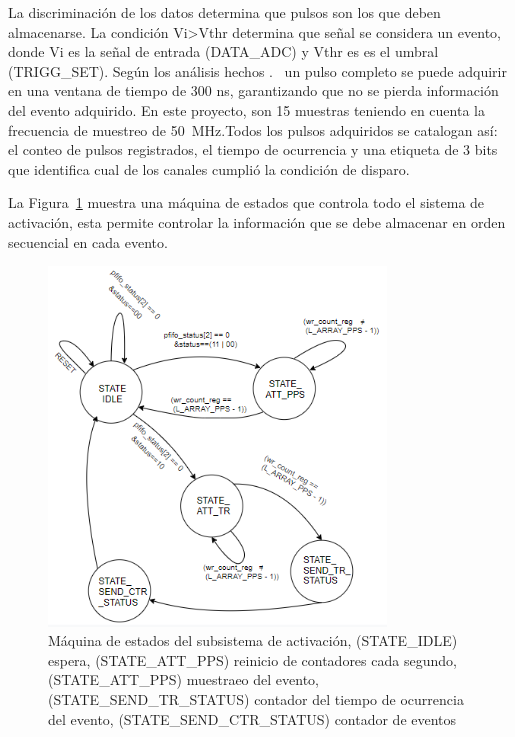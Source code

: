 La discriminación de los datos determina que pulsos son los que deben almacenarse. La condición Vi\textgreater Vthr determina que señal se considera un evento, donde Vi es la señal de entrada (DATA\_ADC) y Vthr es es el umbral (TRIGG\_SET). Según los análisis hechos .~\citep{haro2016data} un pulso completo se puede adquirir en una ventana de tiempo de 300 ns, garantizando que no se pierda información del evento adquirido. En este proyecto, son 15 muestras teniendo en cuenta la frecuencia de muestreo de 50~MHz.Todos los pulsos adquiridos se catalogan así: el conteo de pulsos registrados, el tiempo de ocurrencia y una etiqueta de 3 bits que identifica cual de los canales cumplió la condición de disparo.

La Figura~\ref{maquina} muestra una máquina de estados que controla todo el sistema de activación, esta permite controlar la información que se debe almacenar en orden secuencial en cada evento.

\begin{figure}[h!]
\includegraphics[width=0.8\textwidth]{Figs/fsms.PNG} 
\centering
\caption[Máquina de estados del subsistema de activación]{Máquina de estados del subsistema de activación, (STATE\_IDLE) espera, (STATE\_ATT\_PPS) reinicio de contadores cada segundo, (STATE\_ATT\_PPS) muestraeo del evento, (STATE\_SEND\_TR\_STATUS) contador del tiempo de ocurrencia del evento, (STATE\_SEND\_CTR\_STATUS) contador de eventos}
\label{maquina}
\end{figure}


